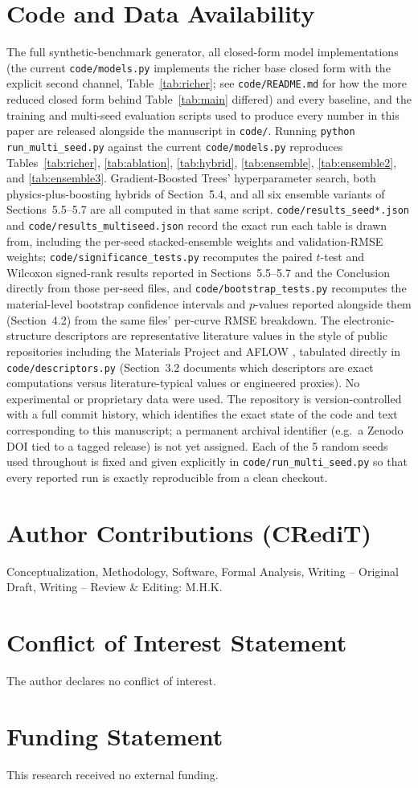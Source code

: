 \documentclass[11pt]{article}
\begin{document}
\section*{Code and Data Availability}
The full synthetic-benchmark generator, all closed-form model implementations (the current \texttt{code/models.py} implements the richer base closed form with the explicit second channel, Table~\ref{tab:richer}; see \texttt{code/README.md} for how the more reduced closed form behind Table~\ref{tab:main} differed) and every baseline, and the training and multi-seed evaluation scripts used to produce every number in this paper are released alongside the manuscript in \texttt{code/}. Running \texttt{python run\_multi\_seed.py} against the current \texttt{code/models.py} reproduces Tables~\ref{tab:richer}, \ref{tab:ablation}, \ref{tab:hybrid}, \ref{tab:ensemble}, \ref{tab:ensemble2}, and \ref{tab:ensemble3}. Gradient-Boosted Trees' hyperparameter search, both physics-plus-boosting hybrids of Section~5.4, and all six ensemble variants of Sections~5.5--5.7 are all computed in that same script. \texttt{code/results\_seed*.json} and \texttt{code/results\_multiseed.json} record the exact run each table is drawn from, including the per-seed stacked-ensemble weights and validation-RMSE weights; \texttt{code/significance\_tests.py} recomputes the paired $t$-test and Wilcoxon signed-rank results reported in Sections~5.5--5.7 and the Conclusion directly from those per-seed files, and \texttt{code/bootstrap\_tests.py} recomputes the material-level bootstrap confidence intervals and $p$-values reported alongside them (Section~4.2) from the same files' per-curve RMSE breakdown. The electronic-structure descriptors are representative literature values in the style of public repositories including the Materials Project \citep{jain2013materialsproject} and AFLOW \citep{curtarolo2012aflow}, tabulated directly in \texttt{code/descriptors.py} (Section~3.2 documents which descriptors are exact computations versus literature-typical values or engineered proxies). No experimental or proprietary data were used. The repository is version-controlled with a full commit history, which identifies the exact state of the code and text corresponding to this manuscript; a permanent archival identifier (e.g.\ a Zenodo DOI tied to a tagged release) is not yet assigned. Each of the 5 random seeds used throughout is fixed and given explicitly in \texttt{code/run\_multi\_seed.py} so that every reported run is exactly reproducible from a clean checkout.

\section*{Author Contributions (CRediT)}
Conceptualization, Methodology, Software, Formal Analysis, Writing -- Original Draft, Writing -- Review \& Editing: M.H.K.

\section*{Conflict of Interest Statement}
The author declares no conflict of interest.

\section*{Funding Statement}
This research received no external funding.



\end{document}
